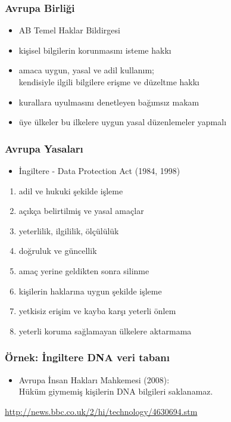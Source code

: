 \documentclass[dvipsnames]{beamer}
\theoremstyle{plain}
\begin{document}
\begin{frame}
  \frametitle{Avrupa Birliği}

  \begin{itemize}
    \item AB Temel Haklar Bildirgesi

    \smallskip
    \item kişisel bilgilerin korunmasını isteme hakkı
    \item amaca uygun, yasal ve adil kullanım;\\
      kendisiyle ilgili bilgilere erişme ve düzeltme hakkı
    \item kurallara uyulmasını denetleyen bağımsız makam

    \bigskip
    \item üye ülkeler bu ilkelere uygun yasal düzenlemeler yapmalı
  \end{itemize}
\end{frame}

\begin{frame}
  \frametitle{Avrupa Yasaları}

  \begin{itemize}
   \item İngiltere - Data Protection Act (1984, 1998)
  \end{itemize}

  \begin{enumerate}
    \item adil ve hukuki şekilde işleme
    \item açıkça belirtilmiş ve yasal amaçlar
    \item yeterlilik, ilgililik, ölçülülük
    \item doğruluk ve güncellik
    \item amaç yerine geldikten sonra silinme
    \item kişilerin haklarına uygun şekilde işleme
    \item yetkisiz erişim ve kayba karşı yeterli önlem
    \item yeterli koruma sağlamayan ülkelere aktarmama
  \end{enumerate}
\end{frame}

\begin{frame}
  \frametitle{Örnek: İngiltere DNA veri tabanı}

  \begin{center}
  \end{center}

  \begin{itemize}
    \item Avrupa İnsan Hakları Mahkemesi (2008):\\
    Hüküm giymemiş kişilerin DNA bilgileri saklanamaz.
  \end{itemize}

  \medskip
  \tiny{\url{http://news.bbc.co.uk/2/hi/technology/4630694.stm}}\\
\end{frame}
\end{document}
